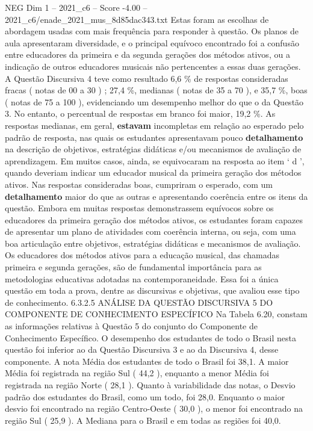\begin{textsample}{NEG Dim 1 – 2021\_c6 – Score -4.00 – 2021\_c6/enade\_2021\_mus\_8d85dac343.txt}
Estas foram as escolhas de abordagem usadas com mais frequência para responder à questão.
Os planos de aula apresentaram diversidade, e o principal equívoco encontrado foi a confusão entre educadores da primeira e da segunda gerações dos métodos ativos, ou a indicação de outros educadores musicais não pertencentes a essas duas gerações.
A Questão Discursiva 4 teve como resultado 6,6 \% de respostas consideradas fracas ( notas de 00 a 30 ) ; 27,4 \%, medianas ( notas de 35 a 70 ), e 35,7 \%, boas ( notas de 75 a 100 ), evidenciando um desempenho melhor do que o da Questão 3.
No entanto, o percentual de respostas em branco foi maior, 19,2 \%.
As respostas medianas, em geral, \textbf{estavam} incompletas em relação ao esperado pelo padrão de resposta, nas quais os estudantes apresentavam pouco \textbf{detalhamento} na descrição de objetivos, estratégias didáticas e/ou mecanismos de avaliação de aprendizagem.
Em muitos casos, ainda, se equivocaram na resposta ao item ‘ d ’, quando deveriam indicar um educador musical da primeira geração dos métodos ativos.
Nas respostas consideradas boas, cumpriram o esperado, com um \textbf{detalhamento} maior do que as outras e apresentando coerência entre os itens da questão.
Embora em muitas respostas demonstrassem equívocos sobre os educadores da primeira geração dos métodos ativos, os estudantes foram capazes de apresentar um plano de atividades com coerência interna, ou seja, com uma boa articulação entre objetivos, estratégias didáticas e mecanismos de avaliação.
Os educadores dos métodos ativos para a educação musical, das chamadas primeira e segunda gerações, são de fundamental importância para as metodologias educativas adotadas na contemporaneidade.
Essa foi a única questão em toda a prova, dentre as discursivas e objetivas, que avaliou esse tipo de conhecimento. 6.3.2.5 ANÁLISE DA QUESTÃO DISCURSIVA 5 DO COMPONENTE DE CONHECIMENTO ESPECÍFICO Na Tabela 6.20, constam as informações relativas à Questão 5 do conjunto do Componente de Conhecimento Específico.
O desempenho dos estudantes de todo o Brasil nesta questão foi inferior ao da Questão Discursiva 3 e ao da Discursiva 4, desse componente.
A nota Média dos estudantes de todo o Brasil foi 38,1.
A maior Média foi registrada na região Sul ( 44,2 ), enquanto a menor Média foi registrada na região Norte ( 28,1 ).
Quanto à variabilidade das notas, o Desvio padrão dos estudantes do Brasil, como um todo, foi 28,0.
Enquanto o maior desvio foi encontrado na região Centro-Oeste ( 30,0 ), o menor foi encontrado na região Sul ( 25,9 ).
A Mediana para o Brasil e em todas as regiões foi 40,0.

\end{textsample}
